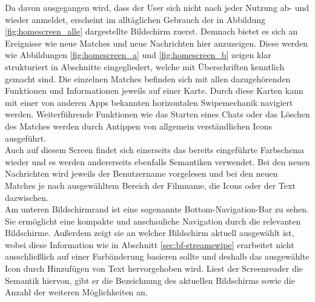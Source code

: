 
Da davon ausgegangen wird, dass der User sich nicht nach jeder Nutzung ab- und wieder anmeldet, erscheint im alltäglichen Gebrauch der in Abbildung \ref{fig:homescreen_alle} dargestellte Bildschirm zuerst. Demnach bietet es sich an Ereignisse wie neue Matches und neue Nachrichten hier anzuzeigen. Diese werden wie Abbildungen \ref{fig:homescreen_a} und \ref{fig:homescreen_b} zeigen klar strukturiert in Abschnitte eingegliedert, welche mit Überschriften kenntlich gemacht sind. Die einzelnen Matches befinden sich mit allen dazugehörenden Funktionen und Informationen jeweils auf einer Karte. Durch diese Karten kann mit einer von anderen \mbox{Apps} bekannten horizontalen Swipemechanik navigiert werden. Weiterführende Funktionen wie das Starten eines Chats oder das Löschen des Matches werden durch  Antippen von allgemein verständlichen Icons ausgeführt. \\
Auch auf diesem Screen findet sich einerseits das bereits eingeführte Farbschema wieder und es werden andererseits ebenfalls Semantiken verwendet. Bei den neuen Nachrichten wird jeweils der Benutzername vorgelesen und bei den neuen Matches je nach ausgewähltem Bereich der Filmname, die Icons oder der Text dazwischen.\\
Am unteren Bildschirmrand ist eine sogenannte Bottom-Navigation-Bar zu sehen. Sie ermöglicht eine kompakte und anschauliche Navigation durch die relevanten Bildschirme. Außerdem zeigt sie an welcher Bildschirm aktuell ausgewählt ist, wobei diese Information wie in Abschnitt \ref{sec:bf-streamswipe} erarbeitet nicht ausschließlich auf einer Farbänderung basieren sollte und deshalb das ausgewählte Icon durch Hinzufügen von Text hervorgehoben wird. Liest der Screenreader die Semantik hiervon, gibt er die Bezeichnung des aktuellen Bildschirms sowie die Anzahl der weiteren Möglichkeiten an. \\

